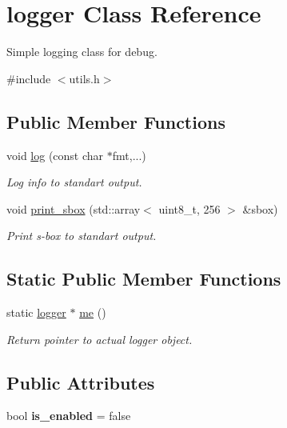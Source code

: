 \hypertarget{classlogger}{}\section{logger Class Reference}
\label{classlogger}


Simple logging class for debug.  




{\ttfamily \#include $<$utils.\+h$>$}

\subsection*{Public Member Functions}
\begin{DoxyCompactItemize}
\item 
void \hyperlink{classlogger_a9a370ab56605a474de25e3fee229cb90}{log} (const char $\ast$fmt,...)
\begin{DoxyCompactList}\small\item\em Log info to standart output. \end{DoxyCompactList}\item 
void \hyperlink{classlogger_a6d4c069f536c8c1ba5b414eb23cd60a5}{print\+\_\+sbox} (std\+::array$<$ uint8\+\_\+t, 256 $>$ \&sbox)
\begin{DoxyCompactList}\small\item\em Print s-\/box to standart output. \end{DoxyCompactList}\end{DoxyCompactItemize}
\subsection*{Static Public Member Functions}
\begin{DoxyCompactItemize}
\item 
static \hyperlink{classlogger}{logger} $\ast$ \hyperlink{classlogger_ad70166a52bca2325ae472aa920a8dbf9}{me} ()
\begin{DoxyCompactList}\small\item\em Return pointer to actual logger object. \end{DoxyCompactList}\end{DoxyCompactItemize}
\subsection*{Public Attributes}
\begin{DoxyCompactItemize}
\item 
\mbox{\label{classlogger_a297bef09e06724f1f52392c55ea616b5}} 
bool {\bfseries is\+\_\+enabled} = false
\end{DoxyCompactItemize}



